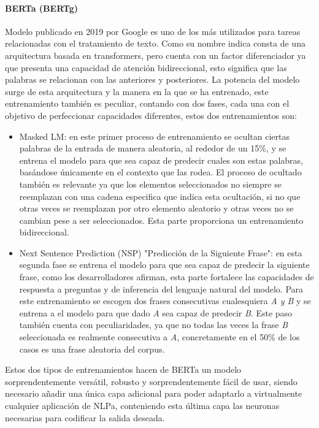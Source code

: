 \paragraph{\gls{BERTa} (\gls{BERTg})} Modelo
publicado en 2019 por Google es uno de los más utilizados para tareas
relacionadas con el tratamiento de texto. Como su nombre indica consta de una
arquitectura basada en transformers, pero cuenta con un factor diferenciador ya
que presenta una capacidad de atención bidireccional, esto significa que las
palabras se relacionan con las anteriores y posteriores.\cite{devlin2019bert} La potencia del modelo
surge de esta arquitectura y la manera en la que se ha entrenado, este
entrenamiento también es peculiar, contando con dos fases, cada una con el objetivo
de perfeccionar capacidades diferentes, estos dos entrenamientos son:
\begin{itemize}
	\item Masked LM: en este primer proceso de entrenamiento se ocultan ciertas
	palabras de la entrada de manera aleatoria, al rededor de un 15\%, y se
	entrena el modelo para que sea capaz de predecir cuales son estas palabras,
	basándose únicamente en el contexto que las rodea. El proceso de ocultado
	también es relevante ya que los elementos seleccionados no siempre se reemplazan
	con una cadena especifica que indica esta ocultación, si no que otras veces
	se reemplazan por otro elemento aleatorio y otras veces no se cambian pese a
	ser seleccionados. Esta parte proporciona un entrenamiento bidireccional.\cite{devlin2019bert}
	
	\item Next Sentence Prediction (NSP) "Predicción de la Siguiente Frase": en
	esta segunda fase se entrena el modelo para que sea capaz de predecir la
	siguiente frase, como los desarrolladores afirman, esta parte fortalece las
	capacidades de respuesta a preguntas y de inferencia del lenguaje natural
	del modelo. Para este entrenamiento se escogen dos frases consecutivas
	cualesquiera \textit{A y B} y se entrena a el modelo para que dado
	\textit{A} sea capaz de predecir \textit{B}. Este paso también cuenta con
	peculiaridades, ya que no todas las veces la frase \textit{B} seleccionada
	es realmente consecutiva a \textit{A}, concretamente en el 50\% de los casos
	es una frase aleatoria del corpus.\cite{devlin2019bert}
\end{itemize}

Estos dos tipos de entrenamientos hacen de \gls{BERTa} un modelo sorprendentemente
versátil, robusto y sorprendentemente fácil de usar, siendo necesario añadir una
única capa adicional para poder adaptarlo a virtualmente cualquier aplicación de
\gls{NLPa}, conteniendo esta última capa las neuronas necesarias para codificar la
salida deseada.

